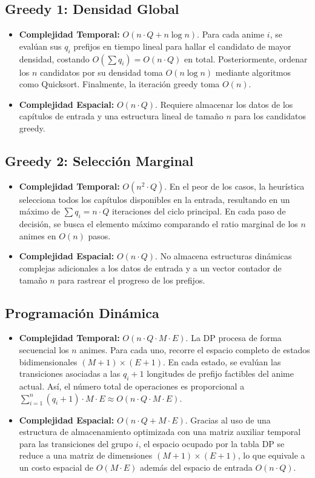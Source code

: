 \documentclass[11pt,spanish]{article} %
\begin{document}
\subsection{Greedy 1: Densidad Global}
\begin{itemize}
    \item \textbf{Complejidad Temporal:} $O(n \cdot Q + n \log n)$. Para cada anime $i$, se evalúan sus $q_i$ prefijos en tiempo lineal para hallar el candidato de mayor densidad, costando $O(\sum q_i) = O(n \cdot Q)$ en total. Posteriormente, ordenar los $n$ candidatos por su densidad toma $O(n \log n)$ mediante algoritmos como Quicksort. Finalmente, la iteración greedy toma $O(n)$.
    \item \textbf{Complejidad Espacial:} $O(n \cdot Q)$. Requiere almacenar los datos de los capítulos de entrada y una estructura lineal de tamaño $n$ para los candidatos greedy.
\end{itemize}

\subsection{Greedy 2: Selección Marginal}
\begin{itemize}
    \item \textbf{Complejidad Temporal:} $O(n^2 \cdot Q)$. En el peor de los casos, la heurística selecciona todos los capítulos disponibles en la entrada, resultando en un máximo de $\sum q_i = n \cdot Q$ iteraciones del ciclo principal. En cada paso de decisión, se busca el elemento máximo comparando el ratio marginal de los $n$ animes en $O(n)$ pasos.
    \item \textbf{Complejidad Espacial:} $O(n \cdot Q)$. No almacena estructuras dinámicas complejas adicionales a los datos de entrada y a un vector contador de tamaño $n$ para rastrear el progreso de los prefijos.
\end{itemize}

\subsection{Programación Dinámica}
\begin{itemize}
    \item \textbf{Complejidad Temporal:} $O(n \cdot Q \cdot M \cdot E)$. La DP procesa de forma secuencial los $n$ animes. Para cada uno, recorre el espacio completo de estados bidimensionales $(M+1) \times (E+1)$. En cada estado, se evalúan las transiciones asociadas a las $q_i + 1$ longitudes de prefijo factibles del anime actual. Así, el número total de operaciones es proporcional a $\sum_{i=1}^n (q_i + 1) \cdot M \cdot E \approx O(n \cdot Q \cdot M \cdot E)$.
    \item \textbf{Complejidad Espacial:} $O(n \cdot Q + M \cdot E)$. Gracias al uso de una estructura de almacenamiento optimizada con una matriz auxiliar temporal para las transiciones del grupo $i$, el espacio ocupado por la tabla DP se reduce a una matriz de dimensiones $(M+1) \times (E+1)$, lo que equivale a un costo espacial de $O(M \cdot E)$ además del espacio de entrada $O(n \cdot Q)$.
\end{itemize}
\end{document}
